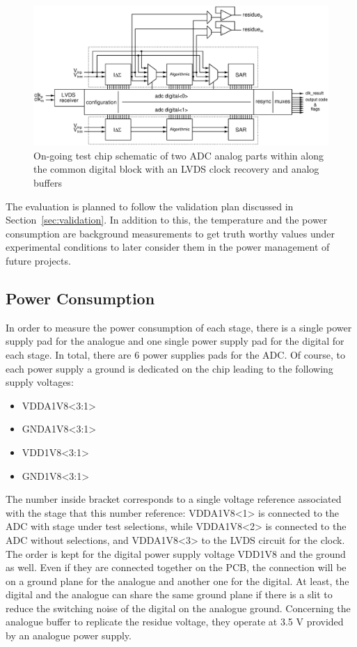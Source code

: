 \begin{figure}[htp]
    \centering
    \includegraphics[width=\textwidth]{Chapter5/Figs/adc_chip/top_adc_chip.ps}%
    \caption{On-going test chip schematic of two ADC analog parts within along the common digital block with an LVDS clock recovery and analog buffers}
    \label{fig:top-chip}
\end{figure}

The evaluation is planned to follow the validation plan discussed in Section~\ref{sec:validation}. In addition to this, the temperature and the power consumption are background measurements to get truth worthy values under experimental conditions to later consider them in the power management of future projects.

\subsection{Power Consumption}
In order to measure the power consumption of each stage, there is a single power supply pad for the analogue and one single power supply pad for the digital for each stage. In total, there are 6 power supplies pads for the ADC\@. Of course, to each power supply a ground is dedicated on the chip leading to the following supply voltages:
\begin{itemize}
    \item VDDA1V8<3:1> 
    \item GNDA1V8<3:1>
    \item VDD1V8<3:1>
    \item GND1V8<3:1>
\end{itemize}
The number inside bracket corresponds to a single voltage reference associated with the stage that this number reference: VDDA1V8<1> is connected to the ADC with stage under test selections, while VDDA1V8<2> is connected to the ADC without selections, and VDDA1V8<3> to the LVDS circuit for the clock. The order is kept for the digital power supply voltage VDD1V8 and the ground as well.
Even if they are connected together on the PCB, the connection will be on a ground plane for the analogue and another one for the digital. At least, the digital and the analogue can share the same ground plane if there is a slit to reduce the switching noise of the digital on the analogue ground.
Concerning the analogue buffer to replicate the residue voltage, they operate at 3.5 V provided by an analogue power supply.

